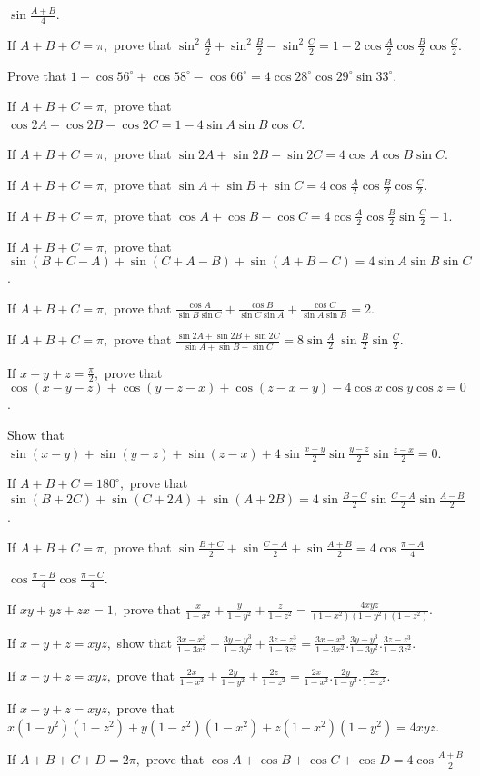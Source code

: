   $\sin \frac{A + B}{4}$.
\item If $A + B + C = \pi,$ prove that $\sin^2\frac{A}{2} + \sin^2\frac{B}{2} - \sin^2\frac{C}{2} = 1 - 2\cos
  \frac{A}{2}\cos \frac{B}{2}\cos \frac{C}{2}$.
\item Prove that $1 + \cos 56^\circ + \cos 58^\circ - \cos 66^\circ = 4\cos28^\circ\cos29^\circ\sin 33^\circ$.
\item If $A + B + C = \pi,$ prove that $\cos 2A + \cos 2B - \cos 2C = 1 - 4\sin A\sin B\cos C$.
\item If $A + B + C = \pi,$ prove that $\sin 2A + \sin 2B - \sin 2C = 4\cos A\cos B\sin C$.
\item If $A + B + C = \pi,$ prove that $\sin A + \sin B + \sin C = 4\cos \frac{A}{2}\cos \frac{B}{2}\cos \frac{C}{2}$.
\item If $A + B + C = \pi,$ prove that $\cos A + \cos B - \cos C = 4\cos \frac{A}{2}\cos \frac{B}{2}\sin \frac{C}{2} - 1$.
\item If $A + B + C = \pi,$ prove that $\sin(B + C - A) + \sin(C + A - B) + \sin(A + B - C) = 4\sin A\sin B\sin C$.
\item If $A + B + C = \pi,$ prove that $\frac{\cos A}{\sin B\sin C} + \frac{\cos B}{\sin C\sin A} + \frac{\cos C}{\sin
  A\sin B} = 2$.
\item If $A + B + C = \pi,$ prove that $\frac{\sin 2A + \sin 2B + \sin 2C}{\sin A + \sin B + \sin C} = 8\sin \frac{A}{2}\
  \sin \frac{B}{2}\sin \frac{C}{2}$.
\item If $x + y + z = \frac{\pi}{2},$ prove that $\cos(x - y - z) + \cos(y - z - x) + \cos(z - x - y) - 4\cos x\cos y\cos
  z = 0$.
\item Show that $\sin(x - y) + \sin(y - z) + \sin(z - x) + 4\sin\frac{x - y}{2}\sin\frac{y - z}{2}\sin \frac{z - x}{2} = 0$.
\item If $A + B + C = 180^\circ,$ prove that $\sin(B + 2C) + \sin(C + 2A) + \sin(A + 2B) = 4\sin\frac{B - C}{2}
  \sin\frac{C - A}{2}\sin\frac{A - B}{2}$.
\item If $A + B + C = \pi,$ prove that $\sin\frac{B + C}{2} + \sin \frac{C + A}{2} + \sin \frac{A + B}{2} =
  4\cos\frac{\pi - A}{4}$

  $\cos\frac{\pi - B}{4}\cos\frac{\pi - C}{4}$.
\item If $xy + yz + zx = 1,$ prove that $\frac{x}{1 - x^2} + \frac{y}{1 - y^2} + \frac{z}{1 - z^2} = \frac{4xyz}{(1 -
  x^2)(1 - y^2)(1 - z^2)}$.
\item If $x + y + z = xyz,$ show that $\frac{3x - x^3}{1 - 3x^2} + \frac{3y - y^3}{1 - 3y^2} + \frac{3z - z^3}{1 - 3z^2}
  = \frac{3x - x^3}{1 - 3x^2}.\frac{3y - y^3}{1 - 3y^2}.\frac{3z - z^3}{1 - 3z^2}$.
\item If $x + y + z = xyz,$ prove that $\frac{2x}{1 - x^2} + \frac{2y}{1 - y^2} + \frac{2z}{1 - z^2} = \frac{2x}{1 -
    x^2}.\frac{2y}{1 - y^2}.\frac{2z}{1 - z^2}$.
\item If $x + y + z = xyz,$ prove that $x(1 - y^2)(1 - z^2) + y(1 - z^2)(1 - x^2) + z(1 - x^2)(1 - y^2) = 4xyz$.
\item If $A + B + C + D = 2\pi,$ prove that $\cos A + \cos B + \cos C + \cos D = 4\cos\frac{A + B}{2}$

